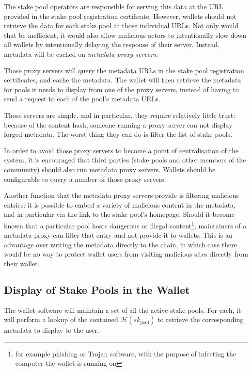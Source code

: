 \documentclass[11pt,a4paper,dvipsnames,twosided]{article}
\begin{document}
The stake pool operators are responsible for serving this data at the URL
provided in the stake pool registration certificate. However, wallets should not
retrieve the data for each stake pool at those individual URLs. Not only would
that be inefficient, it would also allow malicious actors to intentionally slow
down all wallets by intentionally delaying the response of their server.
Instead, metadata will be cached on \emph{metadata proxy servers}.

Those proxy servers will query the metadata URLs in the stake pool registration
certificates, and cache the metadata. The wallet will then retrieve the
metadata for pools it needs to display from one of the proxy servers, instead
of having to send a request to each of the pool's metadata URLs.

Those servers are simple, and in particular, they require relatively little
trust: because of the content hash, someone running a proxy server can not
display forged metadata. The worst thing they can do is filter the list of stake
pools.

In order to avoid those proxy servers to become a point of centralisation of the
system, it is encouraged that third parties (stake pools and other members of
the community) should also run metadata proxy servers. Wallets should be
configurable to query a number of those proxy servers.

Another function that the metadata proxy servers provide is filtering malicious
entries: it is possible to embed a variety of malicious content in the metadata,
and in particular via the link to the stake pool's homepage. Should it become
known that a particular pool hosts dangerous or illegal
content\footnote{for example phishing or Trojan software, with the purpose of
  infecting the computer the wallet is running on}, maintainers of
a metadata proxy can filter that entry and not provide it to wallets. This is an
advantage over writing the metadata directly to the chain, in which case there
would be no way to protect wallet users from visiting malicious sites directly
from their wallet.

\subsection{Display of Stake Pools in the Wallet}
\label{display-of-stake-pools-in-the-wallet}

The wallet software will maintain a set of all the active stake pools. For each,
it will perform a lookup of the contained \(\mathcal{H}(sk_\text{pool})\) to
retrieve the corresponding metadata to display to the user.
\end{document}
